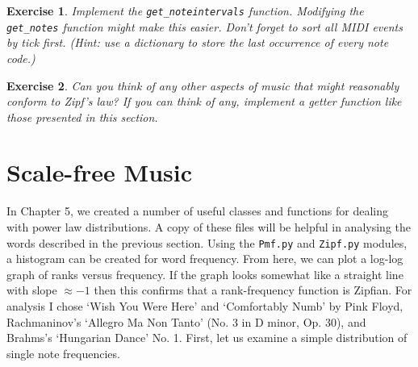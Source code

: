 \documentclass[10pt]{book}
\newtheorem{exercise}{Exercise}[chapter]
\begin{document}
\begin{exercise}
Implement the \texttt{get\_noteintervals} function. Modifying the \texttt{get\_notes} function might make this easier. Don't forget to sort all MIDI events by tick first. (Hint: use a dictionary to store the last occurrence of every note code.)
\end{exercise}

\begin{exercise}
Can you think of any other aspects of music that might reasonably conform to Zipf's law? If you can think of any, implement a getter function like those presented in this section.
\end{exercise}




\section{Scale-free Music}
\label{sec:scalefreemusic}
In Chapter 5, we created a number of useful classes and functions for dealing with power law distributions. A copy of these files will be helpful in analysing the words described in the previous section. Using the \texttt{Pmf.py} and \texttt{Zipf.py} modules, a histogram can be created for word frequency. From here, we can plot a log-log graph of ranks versus frequency. If the graph looks somewhat like a straight line with slope $\approx -1$ then this confirms that a rank-frequency function is Zipfian. For analysis I chose `Wish You Were Here' and `Comfortably Numb' by Pink Floyd, Rachmaninov's `Allegro Ma Non Tanto' (No. 3 in D minor, Op. 30), and Brahms's `Hungarian Dance' No. 1. First, let us examine a simple distribution of single note frequencies.
\end{document}
